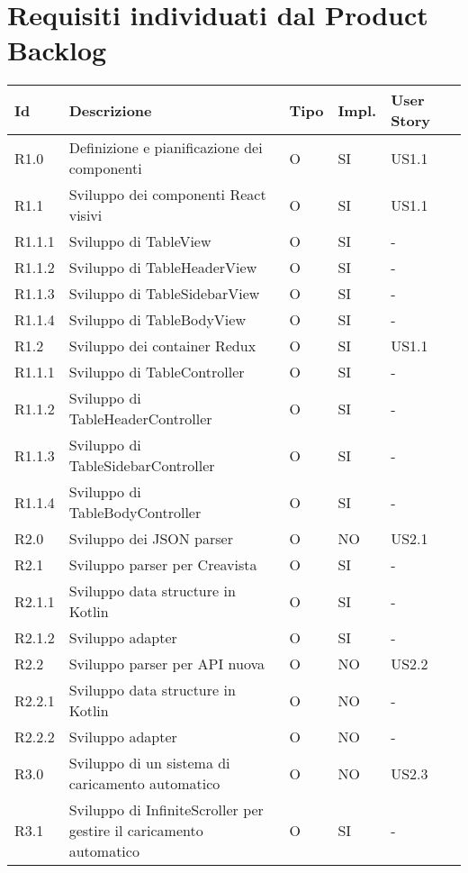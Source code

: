 \section{Requisiti individuati dal Product Backlog}
\begin{longtable} {
		|>{}p{10mm}| 
		|>{}p{60mm}|
		|>{}p{15mm}|
		|>{}p{15mm}|
		|>{}p{15mm}|
		>{}p{0mm}}
	\hline
	\textbf{Id} & \textbf{Descrizione} & \textbf{Tipo} & \textbf{Impl.} & \textbf{User Story} \\ \hline
	R1.0   & Definizione e pianificazione dei componenti & O & SI & US1.1\\ \hline
	
	R1.1   & Sviluppo dei componenti React visivi & O & SI & US1.1 \\ \hline
	R1.1.1 & Sviluppo di TableView                & O & SI & -     \\ \hline
	R1.1.2 & Sviluppo di TableHeaderView          & O & SI & -     \\ \hline
	R1.1.3 & Sviluppo di TableSidebarView         & O & SI & -     \\ \hline
	R1.1.4 & Sviluppo di TableBodyView            & O & SI & -     \\ \hline
	
	R1.2   & Sviluppo dei container Redux       & O & SI & US1.1 \\ \hline
	R1.1.1 & Sviluppo di TableController        & O & SI & -     \\ \hline
	R1.1.2 & Sviluppo di TableHeaderController  & O & SI & -     \\ \hline
	R1.1.3 & Sviluppo di TableSidebarController & O & SI & -     \\ \hline
	R1.1.4 & Sviluppo di TableBodyController    & O & SI & -     \\ \hline
	
	R2.0   & Sviluppo dei JSON parser          & O & NO & US2.1 \\ \hline
	
	R2.1   & Sviluppo parser per Creavista     & O & SI & -     \\ \hline
	R2.1.1 & Sviluppo data structure in Kotlin & O & SI & -     \\ \hline
	R2.1.2 & Sviluppo adapter                  & O & SI & -     \\ \hline
	
	R2.2   & Sviluppo parser per API nuova     & O & NO & US2.2 \\ \hline
	R2.2.1 & Sviluppo data structure in Kotlin & O & NO & -     \\ \hline
	R2.2.2 & Sviluppo adapter                  & O & NO & -     \\ \hline
	
	R3.0 & Sviluppo di un sistema di caricamento automatico                   & O & NO & US2.3 \\ \hline
	R3.1 & Sviluppo di InfiniteScroller per gestire il caricamento automatico & O & SI & - \\ \hline
	\hline
\end{longtable}